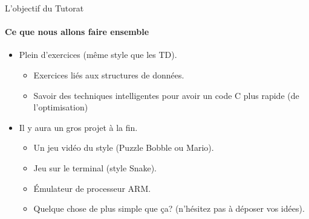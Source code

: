 \documentclass{beamer}
\begin{document}
\begin{darkframes}
  	\begin{frame}{L'objectif du Tutorat}
		\framesubtitle{Ce que nous allons faire ensemble}%
		\begin{itemize}
			\item Plein d'exercices (même style que les TD).
				\begin{itemize}
					\item Exercices liés aux structures de données.
					\item Savoir des techniques intelligentes pour avoir un code C plus rapide (de l'optimisation)
				\end{itemize}
			\item Il y aura un gros projet à la fin.
				\begin{itemize}
					\item Un jeu vidéo du style (Puzzle Bobble ou Mario).
					\item Jeu sur le terminal (style Snake).
					\item Émulateur de processeur ARM.
					\item Quelque chose de plus simple que ça? (n'hésitez pas à déposer vos idées).
				\end{itemize}
		\end{itemize}
	\end{frame}
	

\end{darkframes}
\end{document}
